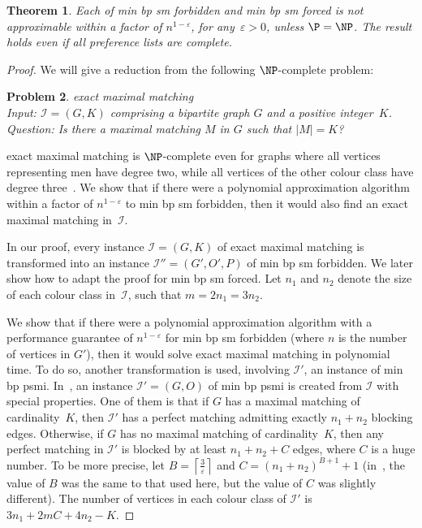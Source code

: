 \documentclass[preprint,12pt]{elsarticle}
\newtheorem{theorem}{Theorem}[section]
\newtheorem{pr}[theorem]{Problem}
\begin{document}
\begin{theorem}
\label{th:inappr_minbp}
Each of {\sc min bp sm forbidden} and {\sc min bp sm forced} is not approximable within a factor of $n^{1-\varepsilon}$, for any~$\varepsilon > 0$, unless $\P = \NP$.  The result holds even if all preference lists are complete.
\end{theorem}

\begin{proof}
We will give a reduction from the following $\NP$-complete problem: 

\begin{pr}{\sc exact maximal matching}\ \\
	Input: $\mathcal{I} = (G, K)$ comprising a bipartite graph $G$ and a positive integer~$K$.\\
	Question: Is there a maximal matching $M$ in $G$ such that $|M| = K$?
\end{pr}

{\sc exact maximal matching} is $\NP$-complete even for graphs where all vertices representing men have degree two, while all vertices of the other colour class have degree three~\cite{OMa07}. We show that if there were a polynomial approximation algorithm within a factor of $n^{1-\varepsilon}$ to {\sc min bp sm forbidden}, then it would also find an exact maximal matching in~$\mathcal{I}$.

In our proof, every instance $\mathcal{I}=(G,K)$ of {\sc exact maximal matching} is transformed into an instance $\mathcal{I''}=(G',O',P)$ of {\sc min bp sm forbidden}.  We later show how to adapt the proof for {\sc min bp sm forced}.  Let $n_1$ and $n_2$ denote the size of each colour class in~$\mathcal{I}$, such that $m = 2 n_1 = 3 n_2$.

We show that if there were a polynomial approximation algorithm with a performance guarantee of $n^{1-\varepsilon}$ for {\sc min bp sm forbidden} (where $n$ is the number of vertices in $G'$), then it would solve {\sc exact maximal matching} in polynomial time.  To do so, another transformation is used, involving $\mathcal{I'}$, an instance of {\sc min bp psmi}. In~\cite{BMM10}, an instance $\mathcal{I'}=(G,O)$ of {\sc min bp psmi} is created from $\mathcal{I}$ with special properties. One of them is that if $G$ has a maximal matching of cardinality~$K$, then $\mathcal{I'}$ has a perfect matching admitting exactly $n_1 + n_2$ blocking edges. Otherwise, if $G$ has no maximal matching of cardinality~$K$, then any perfect matching in $\mathcal{I'}$ is blocked by at least $n_1 + n_2 + C$ edges, where $C$ is a huge number. To be more precise, let $B = \left\lceil\frac{3}{\varepsilon}\right\rceil$ and $C = (n_1 + n_2)^{B+1} + 1$ (in~\cite{BMM10}, the value of $B$ was the same to that used here, but the value of $C$ was slightly different). The number of vertices in each colour class of $\mathcal{I'}$ is $3 n_1 + 2mC + 4n_2 -K$.
	

\end{proof}
\end{document}

